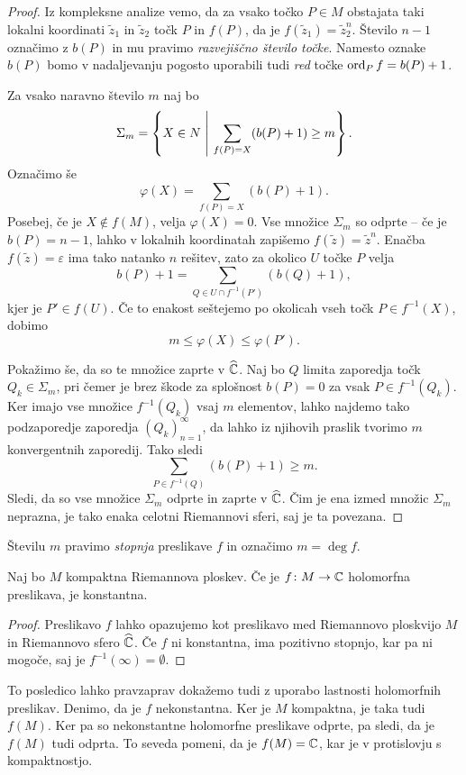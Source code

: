 \begin{proof}
Iz kompleksne analize vemo, da za vsako točko $P \in M$ obstajata
taki lokalni koordinati $\tilde{z}_1$ in $\tilde{z}_2$ točk $P$ in
$f(P)$, da je $f(\tilde{z}_1) = \tilde{z}_2^n$. Število $n-1$
označimo z $b(P)$ in mu pravimo \emph{razvejiščno število točke}.
Namesto oznake $b(P)$ bomo v nadaljevanju pogosto uporabili tudi
\emph{red} točke $\operatorname{ord}_P f = b(P) + 1$.

Za vsako naravno število $m$ naj bo
\[
\Sigma_m =
\left\{X \in N~\middle\vert~\sum_{f(P)=X} (b(P)+1) \geq m\right\}.
\]
Označimo še
\[
\varphi(X) = \sum_{f(P) = X} (b(P)+1).
\]
Posebej, če je $X \not \in f(M)$, velja $\varphi(X) = 0$. Vse
množice $\Sigma_m$ so odprte -- če je $b(P) = n-1$, lahko v
lokalnih koordinatah zapišemo $f(\tilde{z}) = \tilde{z}^n$. Enačba
$f(\tilde{z}) = \varepsilon$ ima tako natanko $n$ rešitev, zato za
okolico $U$ točke $P$ velja
\[
b(P) + 1 = \sum_{Q \in U \cap f^{-1}(P')} (b(Q) + 1),
\]
kjer je $P' \in f(U)$. Če to enakost seštejemo po okolicah vseh
točk $P \in f^{-1}(X)$, dobimo
\[
m \leq \varphi(X) \leq \varphi(P').
\]

Pokažimo še, da so te množice zaprte v $\widehat{\mathbb{C}}$. Naj bo $Q$ limita
zaporedja točk $Q_k \in \Sigma_m$, pri čemer je brez škode za
splošnost $b(P) = 0$ za vsak $P \in f^{-1}(Q_k)$. Ker imajo vse
množice $f^{-1}(Q_k)$ vsaj $m$ elementov, lahko najdemo tako
podzaporedje zaporedja $(Q_k)_{n=1}^\infty$, da lahko iz njihovih
praslik tvorimo $m$ konvergentnih zaporedij. Tako sledi
\[
\sum_{P \in f^{-1}(Q)} (b(P)+1) \geq m.
\]
Sledi, da so vse množice $\Sigma_m$ odprte in zaprte v $\widehat{\mathbb{C}}$. Čim
je ena izmed množic $\Sigma_m$ neprazna, je tako enaka celotni
Riemannovi sferi, saj je ta povezana.
\end{proof}

Številu $m$ pravimo \emph{stopnja} preslikave $f$ in označimo
$m = \deg f$.

\begin{posledica}
Naj bo $M$ kompaktna Riemannova ploskev. Če je $f \colon M \to \mathbb{C}$
holomorfna preslikava, je konstantna.
\end{posledica}

\begin{proof}
Preslikavo $f$ lahko opazujemo kot preslikavo med Riemannovo
ploskvijo $M$ in Riemannovo sfero $\widehat{\mathbb{C}}$. Če $f$ ni konstantna, ima
pozitivno stopnjo, kar pa ni mogoče, saj je
$f^{-1}(\infty) = \emptyset$.
\end{proof}

To posledico lahko pravzaprav dokažemo tudi z uporabo lastnosti
holomorfnih preslikav. Denimo, da je $f$ nekonstantna. Ker je $M$
kompaktna, je taka tudi $f(M)$. Ker pa so nekonstantne holomorfne
preslikave odprte, pa sledi, da je $f(M)$ tudi odprta. To seveda
pomeni, da je $f(M) = \mathbb{C}$, kar je v protislovju s kompaktnostjo.

